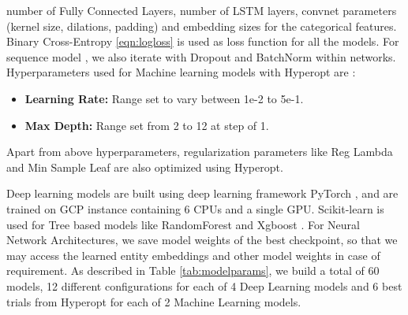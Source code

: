 number of Fully Connected Layers, number of LSTM layers, convnet parameters (kernel size, dilations, padding)
and embedding sizes for the categorical features. Binary Cross-Entropy \ref{eqn:logloss} is used as loss 
function for all the models. For sequence model \cite{sutskever2014sequence}, we also iterate with
Dropout \cite{hinton2012improving} and BatchNorm \cite{santurkar2018does} within networks.
Hyperparameters used for Machine learning models with Hyperopt \cite{bergstra2013hyperopt} are :
  \begin{itemize}
    \item {\bf Learning Rate:} Range set to vary between 1e-2 to 5e-1. 
    \item {\bf Max Depth:} Range set from 2 to 12 at step of 1.
  \end{itemize}
Apart from above hyperparameters, regularization parameters like Reg Lambda and Min Sample Leaf are also optimized using Hyperopt.

Deep learning models are built using deep learning framework
PyTorch \cite{paszke2017automatic}, and are trained on GCP instance containing 6 CPUs and a single GPU. 
Scikit-learn \cite{pedregosa2011scikit} is used for Tree
based models like RandomForest and Xgboost \cite{chen2016xgboost}. For Neural Network Architectures, 
we save model weights of the best checkpoint, so that we may access the learned entity embeddings and other
model weights in case of requirement. As described in Table \ref{tab:modelparams}, we build a total of 60 models, 
12 different configurations for each of 4 Deep Learning models and 6 best trials from Hyperopt \cite{bergstra2013hyperopt} 
for each of 2 Machine Learning models.
